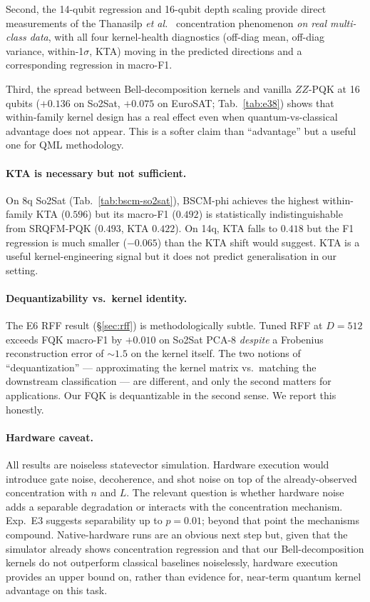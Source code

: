 \documentclass[pdflatex,sn-mathphys-num]{sn-jnl}
\theoremstyle{thmstyleone}
\theoremstyle{thmstyletwo}
\theoremstyle{thmstylethree}
\begin{document}
Second, the 14-qubit regression and 16-qubit depth scaling provide
direct measurements of the Thanasilp \emph{et al.}\ \cite{thanasilp2024}
concentration phenomenon \emph{on real multi-class data}, with all
four kernel-health diagnostics (off-diag mean, off-diag variance,
within-1$\sigma$, KTA) moving in the predicted directions and a
corresponding regression in macro-F1.

Third, the spread between Bell-decomposition kernels and vanilla
$ZZ$-PQK at 16 qubits ($+0.136$ on So2Sat, $+0.075$ on EuroSAT;
Tab.~\ref{tab:e38}) shows that within-family kernel design has a real
effect even when quantum-vs-classical advantage does not appear. This
is a softer claim than ``advantage'' but a useful one for QML
methodology.

\paragraph{KTA is necessary but not sufficient.}
On 8q So2Sat (Tab.~\ref{tab:bscm-so2sat}), BSCM-phi achieves the
highest within-family KTA ($0.596$) but its macro-F1
($0.492$) is statistically indistinguishable from SRQFM-PQK ($0.493$,
KTA $0.422$). On 14q, KTA falls to $0.418$ but the F1 regression is
much smaller ($-0.065$) than the KTA shift would suggest. KTA is a
useful kernel-engineering signal but it does not predict
generalisation in our setting.

\paragraph{Dequantizability vs.\ kernel identity.}
The E6 RFF result (\S\ref{sec:rff}) is methodologically subtle. Tuned
RFF at $D=512$ exceeds FQK macro-F1 by $+0.010$ on So2Sat PCA-8
\emph{despite} a Frobenius reconstruction error of $\sim\!1.5$ on the
kernel itself. The two notions of ``dequantization'' --- approximating
the kernel matrix vs.\ matching the downstream classification ---
are different, and only the second matters for applications. Our FQK
is dequantizable in the second sense. We report this honestly.

\paragraph{Hardware caveat.}\label{sec:limits}
All results are noiseless statevector simulation. Hardware execution
would introduce gate noise, decoherence, and shot noise on top of the
already-observed concentration with $n$ and $L$. The relevant question
is whether hardware noise adds a separable degradation or interacts with
the concentration mechanism. Exp.\ E3 suggests separability up to
$p=0.01$; beyond that point the mechanisms compound. Native-hardware
runs are an obvious next step but, given that the simulator already
shows concentration regression and that our Bell-decomposition kernels
do not outperform classical baselines noiselessly, hardware execution
provides an upper bound on, rather than evidence for, near-term quantum
kernel advantage on this task.
\end{document}

